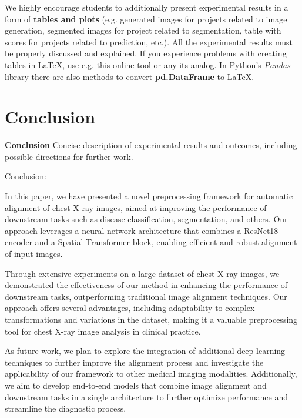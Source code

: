 \documentclass{article}
\begin{document}
We highly encourage students to additionally present experimental results in a form of \textbf{tables and plots} (e.g. generated images for projects related to image generation, segmented images for project related to segmentation, table with scores for projects related to prediction, etc.). All the experimental results must be properly discussed and explained. If you experience problems with creating tables in \LaTeX, use e.g. \href{https://www.tablesgenerator.com}{this online tool} or any its analog. In Python's \textit{Pandas} library there are also methods to convert \href{https://pandas.pydata.org/pandas-docs/stable/reference/api/pandas.DataFrame.to_latex.html}{\textbf{pd.DataFrame}} to \LaTeX  .

\section{Conclusion}\label{conclusion}

\underline{\textbf{Conclusion}} Concise description of experimental results and outcomes, including possible directions for further work.

Conclusion:

In this paper, we have presented a novel preprocessing framework for automatic alignment of chest X-ray images, aimed at improving the performance of downstream tasks such as disease classification, segmentation, and others. Our approach leverages a neural network architecture that combines a ResNet18 encoder and a Spatial Transformer block, enabling efficient and robust alignment of input images.

Through extensive experiments on a large dataset of chest X-ray images, we demonstrated the effectiveness of our method in enhancing the performance of downstream tasks, outperforming traditional image alignment techniques. Our approach offers several advantages, including adaptability to complex transformations and variations in the dataset, making it a valuable preprocessing tool for chest X-ray image analysis in clinical practice.

As future work, we plan to explore the integration of additional deep learning techniques to further improve the alignment process and investigate the applicability of our framework to other medical imaging modalities. Additionally, we aim to develop end-to-end models that combine image alignment and downstream tasks in a single architecture to further optimize performance and streamline the diagnostic process.
\end{document}
